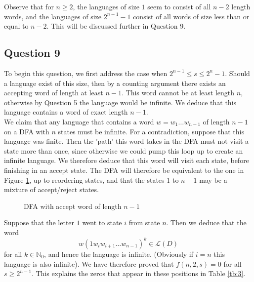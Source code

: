 \documentclass[10pt,a4paper,notitlepage]{article}
\newcommand{\N}{\mathbb{N}}
\begin{document}
Observe that for $n\geq 2$, the languages of size $1$ seem to consist of all $n-2$ length words, and the languages of size $2^{n-1}-1$ consist of all words of size less than or equal to $n-2$. This will be discussed further in Question 9.
\subsection*{\centering Question 9}\label{sc:9}
To begin this question, we first address the case when $2^{n-1}\leq s\leq 2^{n}-1$. Should a language exist of this size, then by a counting argument there exists an accepting word of length at least $n-1$. This word cannot be at least length $n$, otherwise by Question 5 the language would be infinite. We deduce that this language contains a word of exact length $n-1$.\\

We claim that any language that contains a word $w=w_{1}\hdots w_{n-1}$ of length $n-1$ on a DFA with $n$ states must be infinite. For a contradiction, suppose that this language was finite. Then the 'path' this word takes in the DFA must not visit a state more than once, since otherwise we could pump this loop up to create an infinite language. We therefore deduce that this word will visit each state, before finishing in an accept state. The DFA will therefore be equivalent to the one in Figure \ref{fg:1}, up to reordering states, and that the states $1$ to $n-1$ may be a mixture of accept/reject states. 
\begin{figure}[H]
\centering
{}
\caption{DFA with accept word of length $n-1$}\label{fg:1}
\end{figure}
Suppose that the letter $1$ went to state $i$ from state $n$. Then we deduce that the word 
\begin{equation}
w\left(1w_{i}w_{i+1}\hdots w_{n-1}\right)^{k}\in\mathcal{L}(D)
\end{equation}
for all $k\in \N_{0}$, and hence the language is infinite. (Obviously if $i=n$ this language is also infinite). We have therefore proved that $f(n,2,s)=0$ for all $s\geq 2^{n-1}$. This explains the zeros that appear in these positions in Table \ref{tb:3}.\\
\end{document}
